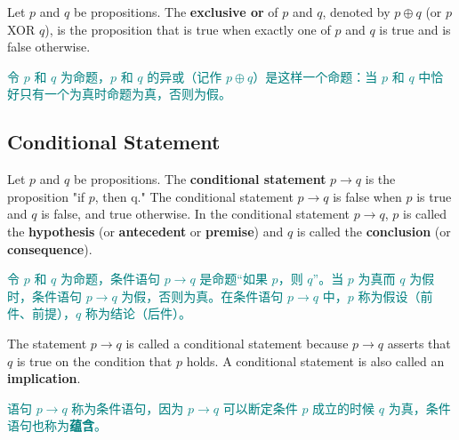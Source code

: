 \documentclass[12pt, a4paper]{article} %
\begin{document}
\begin{definition}
    Let $p$ and $q$ be propositions. The \textbf{exclusive or} of $p$ and $q$, denoted by $p \oplus q$ (or $p$ XOR $q$), is the proposition that is true when exactly one of $p$ and $q$ is true and is false otherwise.
\end{definition}

\begin{theorem}
    \textcolor{teal}{
        令 $p$ 和 $q$ 为命题，$p$ 和 $q$ 的异或（记作 $p \oplus q$）是这样一个命题：当 $p$ 和 $q$ 中恰好只有一个为真时命题为真，否则为假。
    }
\end{theorem}

\subsection{Conditional Statement}

\begin{definition}
    Let $p$ and $q$ be propositions. The \textbf{conditional statement} $p \to q$ is the proposition "if $p$, then q." The conditional statement $p \to q$ is false when $p$ is true and $q$ is false, and true otherwise. In the conditional statement $p \to q$, $p$ is called the \textbf{hypothesis} (or \textbf{antecedent} or \textbf{premise}) and $q$ is called the \textbf{conclusion} (or \textbf{consequence}).
\end{definition}

\begin{theorem}
    \textcolor{teal}{
        令 $p$ 和 $q$ 为命题，条件语句 $p \to q$ 是命题“如果 $p$，则 $q$”。当 $p$ 为真而 $q$ 为假时，条件语句 $p \to q$ 为假，否则为真。在条件语句 $p \to q$ 中，$p$ 称为假设（前件、前提），$q$ 称为结论（后件）。
    }
\end{theorem}

The statement $p \to q$ is called a conditional statement because $p \to q$ asserts that $q$ is true on the condition that $p$ holds. A conditional statement is also called an \textbf{implication}.

\textcolor{teal}{
    语句 $p \to q$ 称为条件语句，因为 $p \to q$ 可以断定条件 $p$ 成立的时候 $q$ 为真，条件语句也称为\textbf{蕴含}。
}
\end{document}
